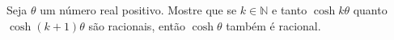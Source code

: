 Seja \(\theta\) um número real positivo. Mostre que se \(k\in \mathbb{N}\) e tanto \(\cosh k \theta\) quanto \(\cosh(k+1) \theta\) são racionais, então \(\cosh \theta\) também é racional.
